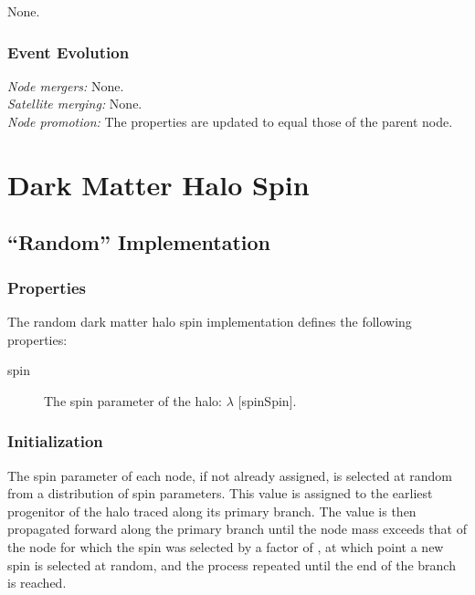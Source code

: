 None.

\subsubsection{Event Evolution}

\noindent\emph{Node mergers:} None.\\

\noindent\emph{Satellite merging:} None.\\

\noindent\emph{Node promotion:} The properties are updated to equal those of the parent node.\\

\section{Dark Matter Halo Spin}\label{sec:DarkMatterHaloSpinComponent}

\subsection{``Random'' Implementation}

\subsubsection{Properties}

The random dark matter halo spin implementation defines the following properties:
\begin{description}
 \item [{\normalfont \ttfamily spin}] The spin parameter of the halo: $\lambda$ [{\normalfont \ttfamily spinSpin}].
\end{description}

\subsubsection{Initialization}

The spin parameter of each node, if not already assigned, is selected at random from a distribution of spin parameters. This value is assigned to the earliest progenitor of the halo traced along its primary branch. The value is then propagated forward along the primary branch until the \gls{node} mass exceeds that of the \gls{node} for which the spin was selected by a factor of {\normalfont \ttfamily [randomSpinResetMassFactor]}, at which point a new spin is selected at random, and the process repeated until the end of the branch is reached. 

